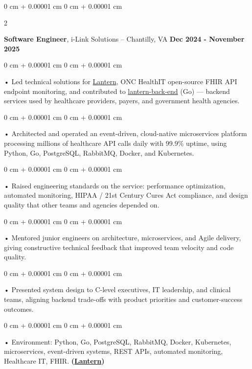 \documentclass[10pt, letterpaper]{article}
\newenvironment{onecolentry}{
    \begin{adjustwidth}{
        0 cm + 0.00001 cm
    }{
        0 cm + 0.00001 cm
    }
}{
    \end{adjustwidth}
} %
\newenvironment{twocolentry}[2][]{
    \onecolentry
    \def\secondColumn{#2}
    \setcolumnwidth{\fill, 4.5 cm}
    \begin{paracol}{2}
}{
    \switchcolumn \raggedleft \secondColumn
    \end{paracol}
    \endonecolentry
} %
\begin{document}
        \vspace{0.1cm}

        \begin{twocolentry}{
            \textbf{Dec 2024 - November 2025}
        }
            \textbf{Software Engineer}, i-Link Solutions -- Chantilly, VA\end{twocolentry}


        \begin{onecolentry}
             • Led technical solutions for \href{https://lantern.healthit.gov/?tab=dashboard_tab}{Lantern}, ONC HealthIT open-source FHIR API endpoint monitoring, and contributed to \href{https://github.com/onc-healthit/lantern-back-end}{lantern-back-end} (Go) --- backend services used by healthcare providers, payers, and government health agencies.
        \end{onecolentry}
        \begin{onecolentry}
             • Architected and operated an event-driven, cloud-native microservices platform processing millions of healthcare API calls daily with 99.9\% uptime, using Python, Go, PostgreSQL, RabbitMQ, Docker, and Kubernetes.
        \end{onecolentry}
        \begin{onecolentry}
             • Raised engineering standards on the service: performance optimization, automated monitoring, HIPAA / 21st Century Cures Act compliance, and design quality that other teams and agencies depended on.
        \end{onecolentry}
        \begin{onecolentry}
             • Mentored junior engineers on architecture, microservices, and Agile delivery, giving constructive technical feedback that improved team velocity and code quality.
        \end{onecolentry}
        \begin{onecolentry}
             • Presented system design to C-level executives, IT leadership, and clinical teams, aligning backend trade-offs with product priorities and customer-success outcomes.
        \end{onecolentry}
        \begin{onecolentry}
             • Environment: Python, Go, PostgreSQL, RabbitMQ, Docker, Kubernetes, microservices, event-driven systems, REST APIs, automated monitoring, Healthcare IT, FHIR. \textbf{(\href{https://lantern.healthit.gov/?tab=dashboard_tab}{Lantern})}
        \end{onecolentry}
        \vspace{0.1cm}
\end{document}
